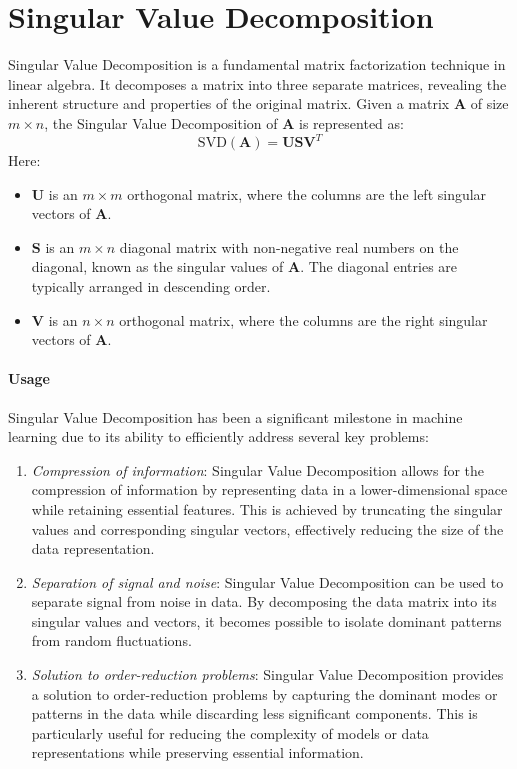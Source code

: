 \section{Singular Value Decomposition}

Singular Value Decomposition is a fundamental matrix factorization technique in linear algebra. 
It decomposes a matrix into three separate matrices, revealing the inherent structure and properties of the original matrix. 
Given a matrix $\mathbf{A}$ of size $m \times n$, the Singular Value Decomposition of $\mathbf{A}$ is represented as:
\[\text{SVD}(\mathbf{A})=\mathbf{U}\mathbf{SV}^T\]
Here: 
\begin{itemize}
    \item $\mathbf{U}$ is an $m \times m$ orthogonal matrix, where the columns are the left singular vectors of $\mathbf{A}$. 
    \item $\mathbf{S}$ is an $m \times n$ diagonal matrix with non-negative real numbers on the diagonal, known as the singular values of $\mathbf{A}$. 
        The diagonal entries are typically arranged in descending order.
    \item $\mathbf{V}$ is an $n \times n$ orthogonal matrix, where the columns are the right singular vectors of $\mathbf{A}$.
\end{itemize} 

\paragraph*{Usage}
Singular Value Decomposition has been a significant milestone in machine learning due to its ability to efficiently address several key problems:
\begin{enumerate}
    \item \textit{Compression of information}: Singular Value Decomposition allows for the compression of information by representing data in a lower-dimensional space while retaining essential features. 
        This is achieved by truncating the singular values and corresponding singular vectors, effectively reducing the size of the data representation.
    \item \textit{Separation of signal and noise}: Singular Value Decomposition can be used to separate signal from noise in data. 
        By decomposing the data matrix into its singular values and vectors, it becomes possible to isolate dominant patterns from random fluctuations.
    \item \textit{Solution to order-reduction problems}: Singular Value Decomposition provides a solution to order-reduction problems by capturing the dominant modes or patterns in the data while discarding less significant components. 
        This is particularly useful for reducing the complexity of models or data representations while preserving essential information.
\end{enumerate}

